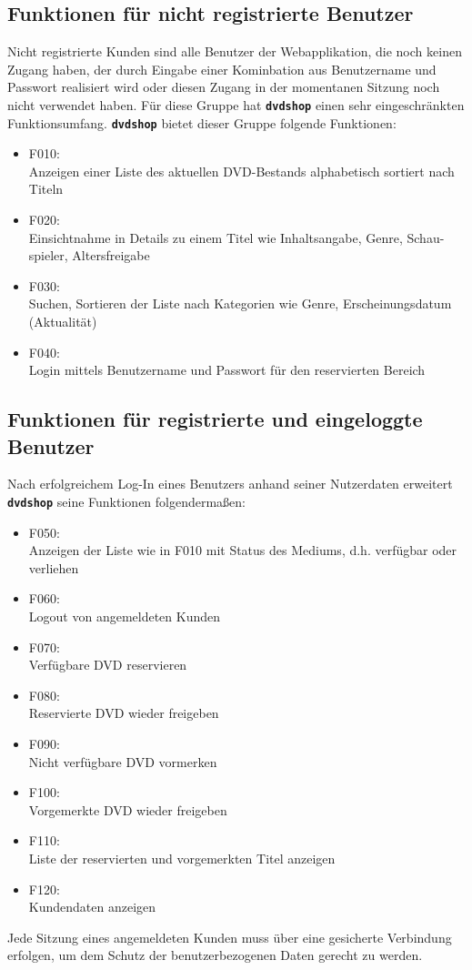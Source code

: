 \documentclass[12pt,oneside,a4paper,bibtotoc,liststotoc,pointlessnumbers]{scrartcl}
\begin{document}
\subsection{Funktionen für nicht registrierte Benutzer}
Nicht registrierte Kunden sind alle Benutzer der Webapplikation, die noch keinen Zugang haben, der durch Eingabe einer Kominbation aus Benutzername und Passwort realisiert wird oder diesen Zugang in der momentanen Sitzung noch nicht verwendet haben. Für diese Gruppe hat \texttt{\textbf{dvdshop}} einen sehr eingeschränkten Funktionsumfang. \texttt{\textbf{dvdshop}} bietet dieser Gruppe folgende Funktionen:
\begin{itemize}
\item F010: \\Anzeigen einer Liste des aktuellen DVD-Bestands alphabetisch sortiert nach Titeln
\item F020: \\ Einsichtnahme in Details zu einem Titel wie Inhaltsangabe, Genre, Schau-spieler, Altersfreigabe
\item F030: \\Suchen, Sortieren der Liste nach Kategorien wie Genre, Erscheinungsdatum (Aktualität)
\item F040: \\Login mittels Benutzername und Passwort für den reservierten Bereich
\end{itemize}
\newpage
\subsection{Funktionen für registrierte und eingeloggte Benutzer}
Nach erfolgreichem Log-In eines Benutzers anhand seiner Nutzerdaten erweitert \texttt{\textbf{dvdshop}} seine Funktionen folgendermaßen:
\begin{itemize}
\item F050: \\Anzeigen der Liste wie in F010 mit Status des Mediums, d.h. verfügbar oder verliehen
\item F060: \\Logout von angemeldeten Kunden
\item F070: \\Verfügbare DVD reservieren
\item F080: \\Reservierte DVD wieder freigeben
\item F090: \\Nicht verfügbare DVD vormerken
\item F100: \\Vorgemerkte DVD wieder freigeben
\item F110: \\Liste der reservierten und vorgemerkten Titel anzeigen
\item F120: \\Kundendaten anzeigen
\end{itemize}
Jede Sitzung eines angemeldeten Kunden muss über eine gesicherte Verbindung erfolgen, um dem Schutz der benutzerbezogenen Daten gerecht zu werden.
\end{document}
